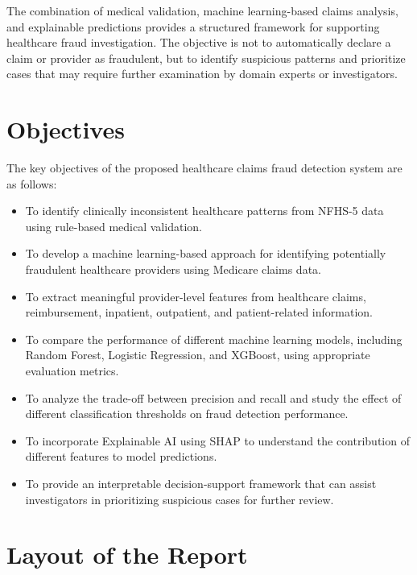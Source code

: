 The combination of medical validation, machine learning-based claims analysis, and explainable predictions provides a structured framework for supporting healthcare fraud investigation. The objective is not to automatically declare a claim or provider as fraudulent, but to identify suspicious patterns and prioritize cases that may require further examination by domain experts or investigators.

\section{Objectives}

The key objectives of the proposed healthcare claims fraud detection system are as follows:

\begin{itemize}

\item To identify clinically inconsistent healthcare patterns from NFHS-5 data using rule-based medical validation.

\item To develop a machine learning-based approach for identifying potentially fraudulent healthcare providers using Medicare claims data.

\item To extract meaningful provider-level features from healthcare claims, reimbursement, inpatient, outpatient, and patient-related information.

\item To compare the performance of different machine learning models, including Random Forest, Logistic Regression, and XGBoost, using appropriate evaluation metrics.

\item To analyze the trade-off between precision and recall and study the effect of different classification thresholds on fraud detection performance.

\item To incorporate Explainable AI using SHAP to understand the contribution of different features to model predictions.

\item To provide an interpretable decision-support framework that can assist investigators in prioritizing suspicious cases for further review.

\end{itemize}

\section{Layout of the Report}

